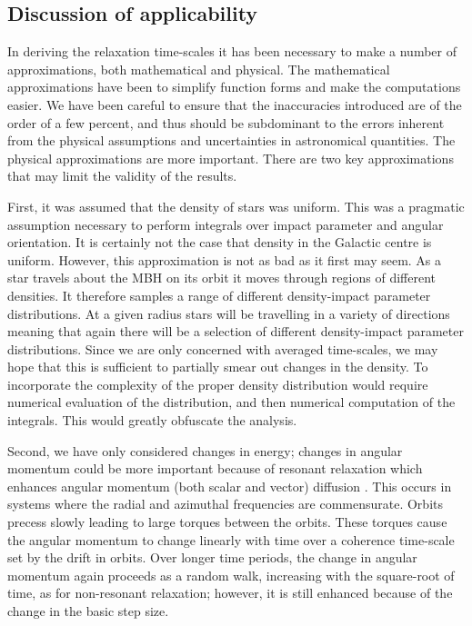 \documentclass[useAMS,usedcolumn,usegraphicx,usenatbib]{mn2e}
\begin{document}
\begin{onecolumn}
\subsection{Discussion of applicability}

In deriving the relaxation time-scales it has been necessary to make a number of approximations, both mathematical and physical. The mathematical approximations have been to simplify function forms and make the computations easier. We have been careful to ensure that the inaccuracies introduced are of the order of a few percent, and thus should be subdominant to the errors inherent from the physical assumptions and uncertainties in astronomical quantities. The physical approximations are more important. There are two key approximations that may limit the validity of the results.

First, it was assumed that the density of stars was uniform. This was a pragmatic assumption necessary to perform integrals over impact parameter and angular orientation. It is certainly not the case that density in the Galactic centre is uniform. However, this approximation is not as bad as it first may seem. As a star travels about the MBH on its orbit it moves through regions of different densities. It therefore samples a range of different density-impact parameter distributions. At a given radius stars will be travelling in a variety of directions meaning that again there will be a selection of different density-impact parameter distributions. Since we are only concerned with averaged time-scales, we may hope that this is sufficient to partially smear out changes in the density. To incorporate the complexity of the proper density distribution would require numerical evaluation of the distribution, and then numerical computation of the integrals. This would greatly obfuscate the analysis.

Second, we have only considered changes in energy; changes in angular momentum could be more important because of resonant relaxation which enhances angular momentum (both scalar and vector) diffusion \citep{Rauch1996,Rauch1998,Gurkan2007,Eilon2009}. This occurs in systems where the radial and azimuthal frequencies are commensurate. Orbits precess slowly leading to large torques between the orbits. These torques cause the angular momentum to change linearly with time over a coherence time-scale set by the drift in orbits. Over longer time periods, the change in angular momentum again proceeds as a random walk, increasing with the square-root of time, as for non-resonant relaxation; however, it is still enhanced because of the change in the basic step size.


\end{onecolumn}
\end{document}
